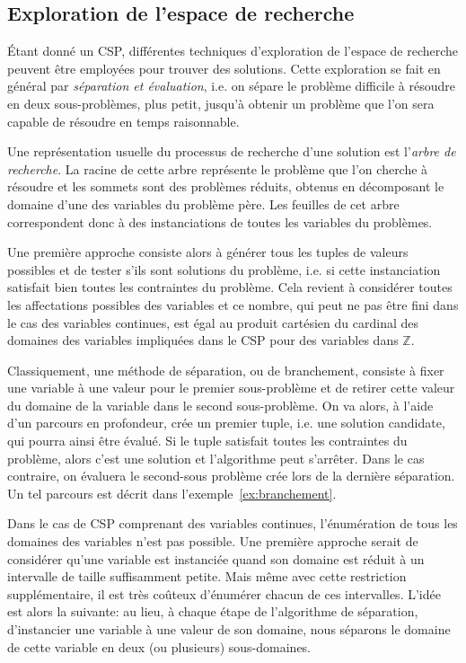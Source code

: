 \subsection{Exploration de l'espace de recherche}
\label{sec:PPC_rech}

{\'E}tant donné un CSP, différentes techniques d'exploration de
l'espace de recherche peuvent être employées pour trouver des
solutions. Cette exploration se fait en général par {\it séparation et
  évaluation}, i.e. on sépare le problème difficile à résoudre en deux
sous-problèmes, plus petit, jusqu'à obtenir un problème que l'on sera
capable de résoudre en temps raisonnable.  

Une représentation usuelle du processus de recherche d'une solution
est l'{\it arbre de recherche}. La racine de cette arbre représente le
problème que l'on cherche à résoudre et les sommets sont des problèmes
réduits, obtenus en décomposant le domaine d'une des variables du
problème père. Les feuilles de cet arbre correspondent donc à des
instanciations de toutes les variables du problèmes.

Une première approche consiste alors à générer tous les
tuples de valeurs possibles et de tester s'ils sont solutions du
problème, i.e. si cette instanciation satisfait bien toutes les
contraintes du problème. Cela revient à considérer toutes les
affectations possibles des variables et ce nombre, qui peut ne pas
être fini dans le cas des variables continues, est égal au produit
cartésien du cardinal des domaines des variables impliquées dans le
CSP pour des variables dans $\mathbb{Z}$.

Classiquement, une méthode de séparation, ou de branchement, consiste
à fixer une variable à une valeur pour le premier sous-problème et de
retirer cette valeur du domaine de la variable dans le second
sous-problème. On va alors, à l'aide d'un parcours en profondeur, crée
un premier tuple, i.e. une solution candidate, qui pourra ainsi être
évalué. Si le tuple satisfait toutes les contraintes du problème,
alors c'est une solution et l'algorithme peut s'arrêter. Dans le cas 
contraire, on évaluera le second-sous problème crée lors de la
dernière séparation. Un tel parcours est décrit dans
l'exemple~\ref{ex:branchement}.

Dans le cas de CSP comprenant des variables continues, l'énumération
de tous les domaines des variables n'est pas possible. Une première
approche serait de considérer qu'une variable est instanciée quand son
domaine est réduit à un intervalle de taille suffisamment petite. Mais
même avec cette restriction supplémentaire, il est très coûteux
d'énumérer chacun de ces intervalles. L'idée est alors la suivante: au
lieu, à chaque étape de l'algorithme de séparation, d'instancier une
variable à une valeur de son domaine, nous séparons le domaine de
cette variable en deux (ou plusieurs) sous-domaines.

